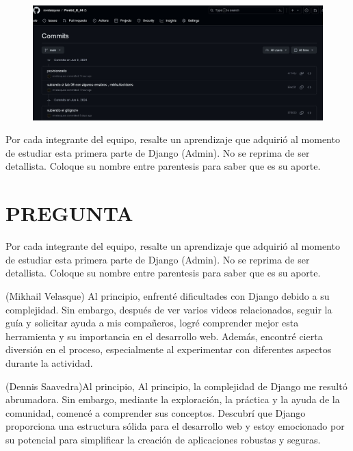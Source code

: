 \documentclass{article}
\begin{document}
	\begin{itemize}
		
		\begin{figure}[H]
			\centering
					\includegraphics[scale=0.3]{img/commits.jpeg} 
		\end{figure}
	\end{itemize}
	
	Por cada integrante del equipo, resalte un aprendizaje que adquirió al momento de estudiar esta
primera parte de Django (Admin). No se reprima de ser detallista. Coloque su nombre entre
parentesis para saber que es su aporte.


\section{PREGUNTA }
	
	Por cada integrante del equipo, resalte un aprendizaje que adquirió al momento de estudiar esta
primera parte de Django (Admin). No se reprima de ser detallista. Coloque su nombre entre
parentesis para saber que es su aporte.

\item (Mikhail Velasque) Al principio, enfrenté dificultades con Django debido a su complejidad. Sin embargo, después de ver varios videos relacionados, seguir la guía y solicitar ayuda a mis compañeros, logré comprender mejor esta herramienta y su importancia en el desarrollo web. Además, encontré cierta diversión en el proceso, especialmente al experimentar con diferentes aspectos durante la actividad.

\item (Dennis Saavedra)Al principio, Al principio, la complejidad de Django me resultó abrumadora. Sin embargo, mediante la exploración, la práctica y la ayuda de la comunidad, comencé a comprender sus conceptos. Descubrí que Django proporciona una estructura sólida para el desarrollo web y estoy emocionado por su potencial para simplificar la creación de aplicaciones robustas y seguras.
\end{document}
